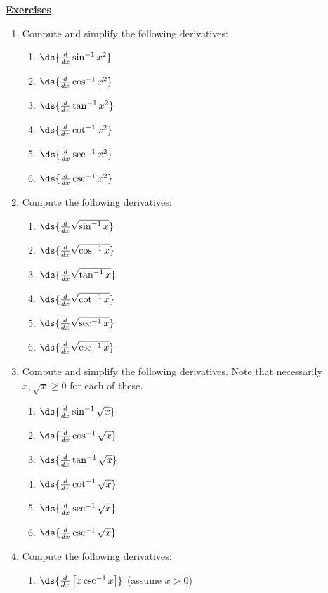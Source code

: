\begin{center}\underline{\Large{\bf Exercises}}\end{center}
\bigskip
\begin{multicols}{2}
\begin{enumerate}
\item Compute and simplify the following derivatives:
  \begin{enumerate}
  \item $\ds{\frac{d}{dx}\sin^{-1}x^2}$
  \item $\ds{\frac{d}{dx}\cos^{-1}x^2}$
  \item $\ds{\frac{d}{dx}\tan^{-1}x^2}$
  \item $\ds{\frac{d}{dx}\cot^{-1}x^2}$
  \item $\ds{\frac{d}{dx}\sec^{-1}x^2}$
  \item $\ds{\frac{d}{dx}\csc^{-1}x^2}$
  \end{enumerate}
\item Compute the following derivatives:
  \begin{enumerate}
  \item $\ds{\frac{d}{dx}\sqrt{\sin^{-1}x}}$
  \item $\ds{\frac{d}{dx}\sqrt{\cos^{-1}x}}$
  \item $\ds{\frac{d}{dx}\sqrt{\tan^{-1}x}}$
  \item $\ds{\frac{d}{dx}\sqrt{\cot^{-1}x}}$
  \item $\ds{\frac{d}{dx}\sqrt{\sec^{-1}x}}$
  \item $\ds{\frac{d}{dx}\sqrt{\csc^{-1}x}}$
  \end{enumerate}
\item Compute and simplify the following derivatives.  Note
      that necessarily $x,\sqrt{x}\ge 0$ for each of these.
  \begin{enumerate}
  \item $\ds{\frac{d}{dx}\sin^{-1}\sqrt{x}}$
  \item $\ds{\frac{d}{dx}\cos^{-1}\sqrt{x}}$
  \item $\ds{\frac{d}{dx}\tan^{-1}\sqrt{x}}$
  \item $\ds{\frac{d}{dx}\cot^{-1}\sqrt{x}}$
  \item $\ds{\frac{d}{dx}\sec^{-1}\sqrt{x}}$
  \item $\ds{\frac{d}{dx}\csc^{-1}\sqrt{x}}$
  \end{enumerate}
\item Compute the following derivatives:
  \begin{enumerate}
  \item $\ds{\frac{d}{dx}\left[{x\csc^{-1}x}\right]}$  (assume $x>0$)

\end{enumerate}
\end{enumerate}
\end{multicols}
